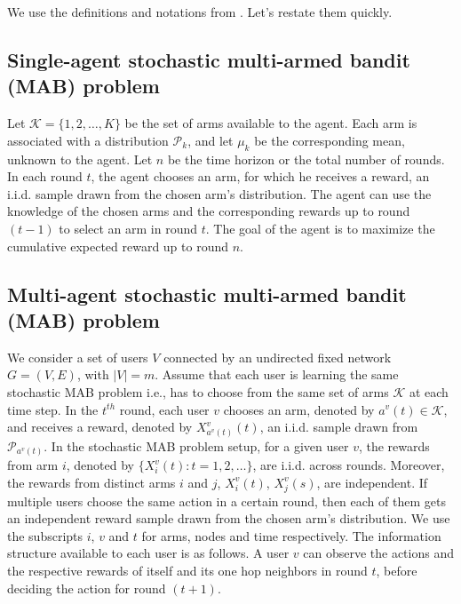 \documentclass{article}
\begin{document}
We use the definitions and notations from \cite{DBLP:journals/corr/KollaJG16}. Let's restate them quickly.

\subsection{Single-agent stochastic multi-armed bandit (MAB) problem}
Let $\mathcal{K} = \lbrace 1, 2,\dots, K \rbrace$ be the set of arms available to the agent. Each arm is associated with a distribution $\mathcal{P}_k$, and let $\mu_k$ be the corresponding mean, unknown to the agent. Let $n$ be the time horizon or the total number of rounds. In each round $t$, the agent chooses an arm, for which he receives a reward, an i.i.d. sample drawn from the chosen arm's distribution. The agent can use the knowledge of the chosen arms and the corresponding rewards up to round $(t-1)$ to select an arm in round $t.$ The goal of the agent is to maximize the cumulative expected reward up to round $n$.

\subsection{Multi-agent stochastic multi-armed bandit (MAB) problem}
We consider a set of users $V$ connected by an undirected fixed network $G=(V,E)$, with $| V | = m$. Assume that each user is learning the same stochastic MAB problem i.e., has to choose from the same set of arms $\mathcal{K}$ at each time step. In the $t^{th}$ round, each user $v$ chooses an arm, denoted by $a^v(t) \in \mathcal{K}$, and receives a reward, denoted by $X^v_{a^v(t)}(t)$, an i.i.d. sample drawn from $\mathcal{P}_{a^v(t)}$.
In the  stochastic MAB problem setup, for a given user $v$, the rewards from arm $i$, denoted by $\{X^v_i(t): t = 1, 2, \ldots \}$, are i.i.d. across rounds. Moreover, the rewards from distinct arms $i$ and $j$, $X^v_i(t)$, $X^v_j(s)$, are independent. If multiple users choose the same action in a certain round, then each of them gets an independent reward sample drawn from the chosen arm's distribution. We use the subscripts $i$, $v$ and $t$ for arms, nodes and time respectively. The information structure available to each user is as follows. A user $v$ can observe the actions and the respective rewards of itself and its one hop neighbors in round $t$, before deciding the action for round $(t+1)$.
\end{document}
